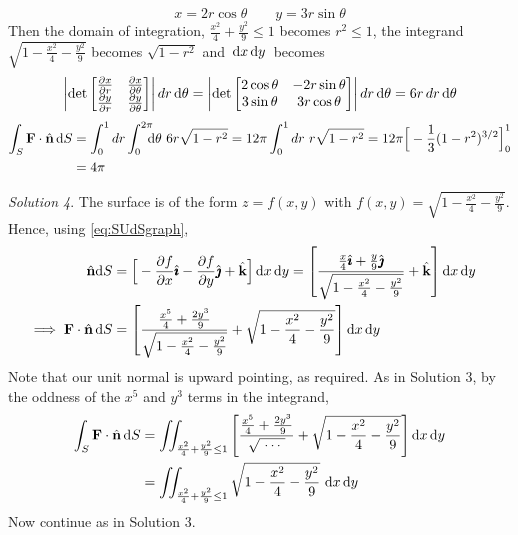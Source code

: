 \begin{eg}
{\begin{equation*}
x=2r\cos\theta\qquad y=3r\sin\theta
\end{equation*}
Then the domain of integration, ${\frac{x^2}{4}+\frac{y^2}{9}\le 1}$
becomes $r^2\le 1$, the integrand $\sqrt{1-\frac{x^2}{4}-\frac{y^2}{9}}$
becomes $\sqrt{1-r^2}$ and $\,\mathrm{d}x\,\mathrm{d}y\,$ becomes
\begin{align*}
\left|\det\left[\begin{matrix}
\frac{\partial x}{\partial r}&\frac{\partial x}{\partial\theta}\\
\frac{\partial y}{\partial r}&\frac{\partial y}{\partial\theta}
\end{matrix}\right]\right|dr\,\mathrm{d}\theta
=\left|\det\left[\begin{matrix}
2\cos\theta&-2r\sin\theta\\
3\sin\theta&3r\cos\theta
\end{matrix}\right]\right|dr\,\mathrm{d}\theta
=6r\,dr\,\mathrm{d}\theta
\end{align*}
}%
\begin{align*}
\int_S \mathbf{F}\cdot\hat{\mathbf{n}}\, \mathrm{d}S
&=\int_0^1 dr\int_0^{2\pi}\hskip-6pt\mathrm{d}\theta\ 6r\sqrt{1-r^2}
=12\pi\int_0^1 dr\ r\sqrt{1-r^2}
=12\pi\Big[-\frac{1}{3}(1-r^2)^{3/2}\Big]_0^1\\
&=4\pi
\end{align*}

\medskip
\noindent\textit{Solution 4}. The surface is of the form $z=f(x,y)$ with
$f(x,y)=\sqrt{1-\frac{x^2}{4}-\frac{y^2}{9}}$. Hence, using 
\eqref{eq:SUdSgraph},
\begin{align*}
\hat{\mathbf{n}} \mathrm{d}S
&=\Big[-\frac{\partial f}{\partial x}\hat{\pmb{\imath}}-\frac{\partial f}{\partial y}\hat{\pmb{\jmath}}
+\hat{\mathbf{k}}\Big]\,\mathrm{d}x\,\mathrm{d}y
=\left[\frac{\frac{x}{4}\hat{\pmb{\imath}}+\frac{y}{9}\hat{\pmb{\jmath}}}
{\sqrt{1-\frac{x^2}{4}-\frac{y^2}{9}}}+\hat{\mathbf{k}}\right]\mathrm{d}x\,\mathrm{d}y\cr
\implies
\mathbf{F}\cdot\hat{\mathbf{n}}\, \mathrm{d}S&=\left[\frac{\frac{x^5}{4}+\frac{2y^3}{9}}
{\sqrt{1-\frac{x^2}{4}-\frac{y^2}{9}}}
+\sqrt{1-\frac{x^2}{4}-\frac{y^2}{9}}\right]\mathrm{d}x\,\mathrm{d}y
\end{align*}
Note that our unit normal is upward pointing, as required.
As in Solution 3, by the oddness of the $x^5$ and $y^3$ terms in the integrand,
\begin{align*}
\int_S \mathbf{F}\cdot\hat{\mathbf{n}}\, \mathrm{d}S
&=\iint_{\frac{x^2}{4}+\frac{y^2}{9}\le 1}
     \left[\frac{\frac{x^5}{4}+\frac{2y^3}{9}}{\sqrt{\ \cdots\ }}
    +\sqrt{1-\frac{x^2}{4}-\frac{y^2}{9}}\right]\mathrm{d}x\,\mathrm{d}y\\
&=\iint_{\frac{x^2}{4}+\frac{y^2}{9}\le 1}
             \sqrt{1-\frac{x^2}{4}-\frac{y^2}{9}}\ \mathrm{d}x\,\mathrm{d}y
\end{align*}
Now continue as in Solution 3.


\end{eg}

